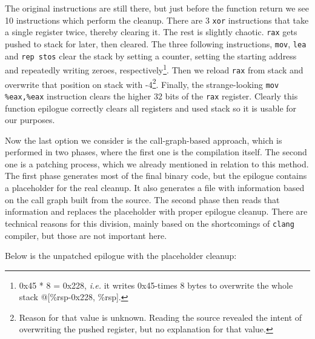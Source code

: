 \documentclass[a4paper,10pt,openright]{memoir}
\newcommand{\ie}{\emph{i.e.}\xspace}
\newcommand{\code}[1]{\texttt{#1}}
\begin{document}
The original instructions are still there, but just before the function 
return we see 10 instructions which perform the cleanup. There are 3 
\code{xor} instructions that take a single register twice, thereby 
clearing it. The rest is slightly chaotic. \code{rax} gets pushed to 
stack for later, then cleared. The three following instructions, 
\code{mov}, \code{lea} and \code{rep stos} clear the stack by setting a 
counter, setting the starting address and repeatedly writing zeroes, 
respectively\footnote{0x45 * 8 = 0x228, \ie it writes 0x45-times 8 
bytes to overwrite the whole stack @[\%rsp-0x228, \%rsp].}. Then we 
reload \code{rax} from stack and overwrite that position on stack with 
-4\footnote{Reason for that value is unknown. Reading the source 
revealed the intent of overwriting the pushed register, but no 
explanation for that value.}. Finally, the strange-looking \code{mov 
\%eax,\%eax} instruction clears the higher 32 bits of the \code{rax} 
register.
Clearly this function epilogue correctly clears all registers and used 
stack so it is usable for our purposes.

Now the last option we consider is the call-graph-based approach, which 
is performed in two phases, where the first one is the compilation 
itself. The second one is a patching process, which we already 
mentioned in relation to this method. The first phase generates most of 
the final binary code, but the epilogue contains a placeholder for the 
real cleanup. It also generates a file with information based on the 
call graph built from the source. The second phase then reads that 
information and replaces the placeholder with proper epilogue cleanup. 
There are technical reasons for this division, mainly based on the 
shortcomings of \code{clang} compiler, but those are not important here.

Below is the unpatched epilogue with the placeholder cleanup:
\end{document}
